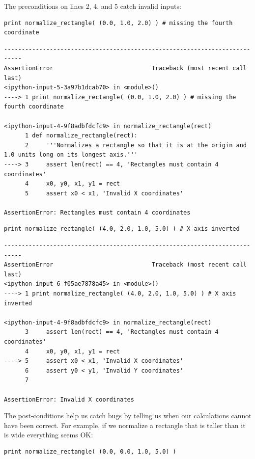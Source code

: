 \documentclass[]{book}
\begin{document}
The preconditions on lines 2, 4, and 5 catch invalid inputs:

\begin{verbatim}
print normalize_rectangle( (0.0, 1.0, 2.0) ) # missing the fourth coordinate
\end{verbatim}

\begin{verbatim}
---------------------------------------------------------------------------
AssertionError                            Traceback (most recent call last)
<ipython-input-5-3a97b1dcab70> in <module>()
----> 1 print normalize_rectangle( (0.0, 1.0, 2.0) ) # missing the fourth coordinate

<ipython-input-4-9f8adbfdcfc9> in normalize_rectangle(rect)
      1 def normalize_rectangle(rect):
      2     '''Normalizes a rectangle so that it is at the origin and 1.0 units long on its longest axis.'''
----> 3     assert len(rect) == 4, 'Rectangles must contain 4 coordinates'
      4     x0, y0, x1, y1 = rect
      5     assert x0 < x1, 'Invalid X coordinates'

AssertionError: Rectangles must contain 4 coordinates
\end{verbatim}

\begin{verbatim}
print normalize_rectangle( (4.0, 2.0, 1.0, 5.0) ) # X axis inverted
\end{verbatim}

\begin{verbatim}
---------------------------------------------------------------------------
AssertionError                            Traceback (most recent call last)
<ipython-input-6-f05ae7878a45> in <module>()
----> 1 print normalize_rectangle( (4.0, 2.0, 1.0, 5.0) ) # X axis inverted

<ipython-input-4-9f8adbfdcfc9> in normalize_rectangle(rect)
      3     assert len(rect) == 4, 'Rectangles must contain 4 coordinates'
      4     x0, y0, x1, y1 = rect
----> 5     assert x0 < x1, 'Invalid X coordinates'
      6     assert y0 < y1, 'Invalid Y coordinates'
      7

AssertionError: Invalid X coordinates
\end{verbatim}

The post-conditions help us catch bugs by telling us when our
calculations cannot have been correct. For example, if we normalize a
rectangle that is taller than it is wide everything seems OK:

\begin{verbatim}
print normalize_rectangle( (0.0, 0.0, 1.0, 5.0) )
\end{verbatim}
\end{document}
